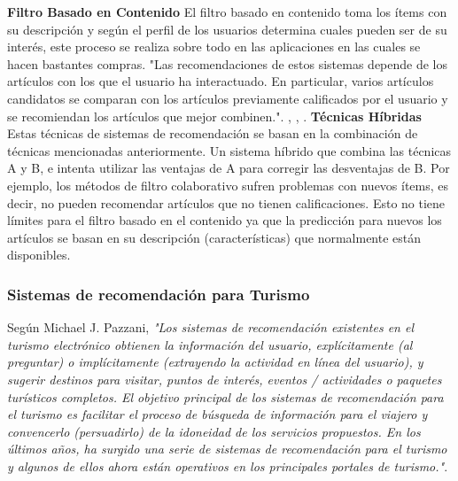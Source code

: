\documentclass[12pt,letterpaper,openany]{book}
\begin{document}
\vspace{5mm}\newline
\textbf{Filtro Basado en Contenido}\newline
El filtro basado en contenido toma los ítems con su descripción y según el perfil de los usuarios determina cuales pueden ser de su interés, este proceso se realiza sobre todo en las aplicaciones en las cuales se hacen bastantes compras. "Las recomendaciones de estos sistemas depende de los artículos con los que el usuario ha interactuado. En particular, varios artículos candidatos se comparan con los artículos previamente calificados por el usuario y se recomiendan los artículos que mejor combinen.". \cite{13}, \cite{16}, \cite{17}.
\vspace{5mm}\newline
\textbf{Técnicas Híbridas}\newline
Estas técnicas de sistemas de recomendación se basan en la combinación de técnicas mencionadas anteriormente. Un sistema híbrido que combina las técnicas A y B, e intenta utilizar las ventajas de A para corregir las desventajas de B. Por ejemplo, los métodos de filtro colaborativo sufren problemas con nuevos ítems, es decir, no pueden recomendar artículos que no tienen calificaciones. Esto no tiene límites para el filtro basado en el contenido ya que la predicción para nuevos los artículos se basan en su descripción (características) que normalmente están disponibles\cite{13}. 

\subsubsection{Sistemas de recomendación para Turismo}
Según Michael J. Pazzani, \textit{"Los sistemas de recomendación existentes en el turismo electrónico obtienen la información del usuario, explícitamente (al preguntar) o implícitamente (extrayendo la actividad en línea del usuario), y sugerir destinos para visitar, puntos de interés, eventos / actividades o paquetes turísticos completos. El objetivo principal de los sistemas de recomendación para el turismo es facilitar el proceso de búsqueda de información para el viajero y convencerlo (persuadirlo) de la idoneidad de los servicios propuestos. En los últimos años, ha surgido una serie de sistemas de recomendación para el turismo y algunos de ellos ahora están operativos en los principales portales de turismo."}\cite{16}. 
\end{document}
